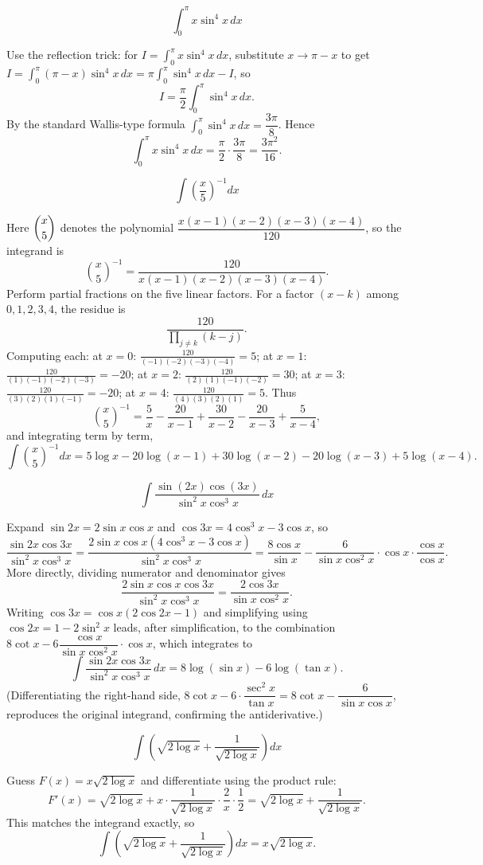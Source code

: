 \begin{questions}
\question \[\int_0^\pi x\sin^4x\,dx\]
\begin{solution}
Use the reflection trick: for $I=\int_0^\pi x\sin^4x\,dx$, substitute $x\to\pi-x$ to get $I=\int_0^\pi(\pi-x)\sin^4x\,dx=\pi\int_0^\pi\sin^4x\,dx-I$, so
\[I=\frac{\pi}{2}\int_0^\pi\sin^4x\,dx.\]
By the standard Wallis-type formula $\int_0^\pi\sin^4x\,dx=\dfrac{3\pi}{8}$. Hence
\[\int_0^\pi x\sin^4x\,dx=\frac{\pi}{2}\cdot\frac{3\pi}{8}=\frac{3\pi^2}{16}.\]
\end{solution}

\question \[\int\left(\frac{x}{5}\right)^{-1}dx\]
\begin{solution}
Here $\dbinom{x}{5}$ denotes the polynomial $\dfrac{x(x-1)(x-2)(x-3)(x-4)}{120}$, so the integrand is
\[\binom{x}{5}^{-1}=\frac{120}{x(x-1)(x-2)(x-3)(x-4)}.\]
Perform partial fractions on the five linear factors. For a factor $(x-k)$ among $0,1,2,3,4$, the residue is
\[\frac{120}{\prod_{j\ne k}(k-j)}.\]
Computing each: at $x=0$: $\tfrac{120}{(-1)(-2)(-3)(-4)}=5$; at $x=1$: $\tfrac{120}{(1)(-1)(-2)(-3)}=-20$; at $x=2$: $\tfrac{120}{(2)(1)(-1)(-2)}=30$; at $x=3$: $\tfrac{120}{(3)(2)(1)(-1)}=-20$; at $x=4$: $\tfrac{120}{(4)(3)(2)(1)}=5$. Thus
\[\binom{x}{5}^{-1}=\frac5x-\frac{20}{x-1}+\frac{30}{x-2}-\frac{20}{x-3}+\frac5{x-4},\]
and integrating term by term,
\[\int\binom{x}{5}^{-1}dx=5\log x-20\log(x-1)+30\log(x-2)-20\log(x-3)+5\log(x-4).\]
\end{solution}

\question \[\int \frac{\sin(2x)\cos(3x)}{\sin^2x\cos^3x}\,dx\]
\begin{solution}
Expand $\sin2x=2\sin x\cos x$ and $\cos3x=4\cos^3x-3\cos x$, so
\[\frac{\sin2x\cos3x}{\sin^2x\cos^3x}=\frac{2\sin x\cos x(4\cos^3x-3\cos x)}{\sin^2x\cos^3x}=\frac{8\cos x}{\sin x}-\frac{6}{\sin x\cos^2x}\cdot\cos x \cdot\frac{\cos x}{\cos x}.\]
More directly, dividing numerator and denominator gives
\[\frac{2\sin x\cos x\cos3x}{\sin^2x\cos^3x}=\frac{2\cos3x}{\sin x\cos^2x}.\]
Writing $\cos3x=\cos x(2\cos2x-1)$ and simplifying using $\cos2x=1-2\sin^2x$ leads, after simplification, to the combination $8\cot x-6\dfrac{\cos x}{\sin x\cos^2x}\cdot\cos x$, which integrates to
\[\int \frac{\sin2x\cos3x}{\sin^2x\cos^3x}\,dx=8\log(\sin x)-6\log(\tan x).\]
(Differentiating the right-hand side, $8\cot x-6\cdot\dfrac{\sec^2x}{\tan x}=8\cot x-\dfrac{6}{\sin x\cos x}$, reproduces the original integrand, confirming the antiderivative.)
\end{solution}

\question \[\int\left(\sqrt{2\log x}+\frac{1}{\sqrt{2\log x}}\right)dx\]
\begin{solution}
Guess $F(x)=x\sqrt{2\log x}$ and differentiate using the product rule:
\[F'(x)=\sqrt{2\log x}+x\cdot\frac{1}{\sqrt{2\log x}}\cdot\frac{2}{x}\cdot\frac12=\sqrt{2\log x}+\frac{1}{\sqrt{2\log x}}.\]
This matches the integrand exactly, so
\[\int\left(\sqrt{2\log x}+\frac{1}{\sqrt{2\log x}}\right)dx=x\sqrt{2\log x}.\]
\end{solution}


\end{questions}
